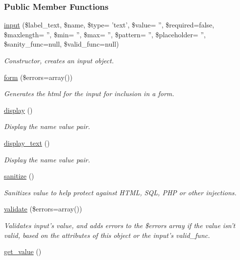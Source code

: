 \subsubsection*{Public Member Functions}
\begin{DoxyCompactItemize}
\item 
\hyperlink{classinput_a13d088ddc4014c18efd350940632ecc0}{input} (\$label\-\_\-text, \$name, \$type= 'text', \$value= '', \$required=false, \$maxlength= '', \$min= '', \$max= '', \$pattern= '', \$placeholder= '', \$sanity\-\_\-func=null, \$valid\-\_\-func=null)
\begin{DoxyCompactList}\small\item\em Constructor, creates an input object. \end{DoxyCompactList}\item 
\hyperlink{classinput_a83b663057f1d0f61768bc12c5a55f25c}{form} (\$errors=array())
\begin{DoxyCompactList}\small\item\em Generates the html for the input for inclusion in a form. \end{DoxyCompactList}\item 
\hyperlink{classinput_a993053ef011cade1db0ceaccb1f4da53}{display} ()
\begin{DoxyCompactList}\small\item\em Display the name value pair. \end{DoxyCompactList}\item 
\hyperlink{classinput_a344058a20cc48c9fe170b3b59905a53b}{display\-\_\-text} ()
\begin{DoxyCompactList}\small\item\em Display the name value pair. \end{DoxyCompactList}\item 
\hyperlink{classinput_ab8456d2b5a929801af6fe0b36afd458c}{sanitize} ()
\begin{DoxyCompactList}\small\item\em Sanitizes value to help protect against H\-T\-M\-L, S\-Q\-L, P\-H\-P or other injections. \end{DoxyCompactList}\item 
\hyperlink{classinput_aaf4ed91e7abbc20e2396a4b07dbd031a}{validate} (\$errors=array())
\begin{DoxyCompactList}\small\item\em Validates input's value, and adds errors to the \$errors array if the value isn't valid, based on the attributes of this object or the input's valid\-\_\-func. \end{DoxyCompactList}\item 
\hypertarget{classinput_a1b3bcdbb596a1154a944a169ac67f547}{\hyperlink{classinput_a1b3bcdbb596a1154a944a169ac67f547}{get\-\_\-value} ()}\label{classinput_a1b3bcdbb596a1154a944a169ac67f547}


\end{DoxyCompactItemize}
